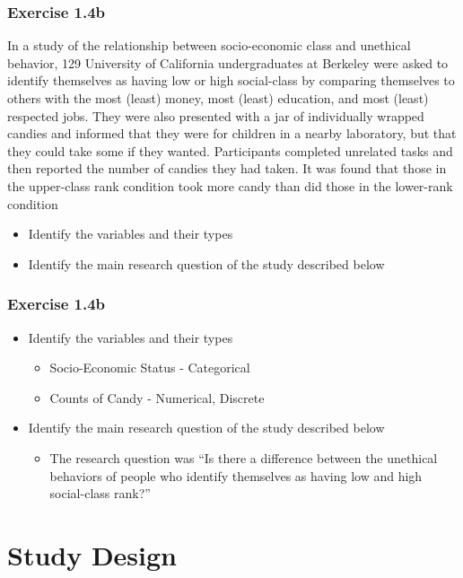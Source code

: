 \documentclass[mathserif]{beamer}
\begin{document}
\begin{frame}[t]
\frametitle{Exercise 1.4b}
In a study of the relationship between socio-economic class and unethical behavior, 129 University of California undergraduates at Berkeley were asked to identify themselves as having low or high social-class by comparing themselves to others with the most (least) money, most (least) education, and most (least) respected jobs. They were also presented with a jar of individually wrapped candies and informed that they were for children in a nearby laboratory, but that they could take some if they wanted. Participants completed unrelated tasks and then reported the number of candies they had taken. It was found that those in the upper-class rank condition took more candy than did those in the lower-rank condition
\begin{itemize}
	\item{Identify the variables and their types}
	\item{Identify the main research question of the study described below}
\end{itemize}
\end{frame}

\begin{frame}[t]
\frametitle{Exercise 1.4b}
\begin{itemize}
	\item{Identify the variables and their types}
	\begin{itemize}
		\item<2->{Socio-Economic Status - Categorical}
		\item<2->{Counts of Candy - Numerical, Discrete}
	\end{itemize}
	\item{Identify the main research question of the study described below}
	\begin{itemize}
		\item<3->{The research question was ``Is there a difference between the unethical behaviors of people who identify themselves as having low and high social-class rank?''}
	\end{itemize}
\end{itemize}
\end{frame}

\section{Study Design}
\end{document}

